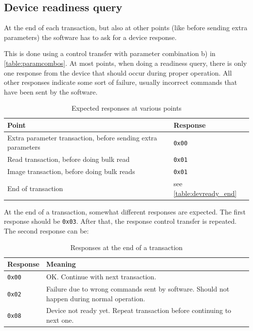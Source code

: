 \documentclass{article}
\begin{document}
\subsection{Device readiness query}
\label{ssec:devready}

At the end of each transaction, but also at other points (like before
sending extra parameters) the software has to ask for a device response.

This is done using a control transfer with parameter combination b) in \autoref{table:paramcombos}.
At most points, when doing a readiness query, there is only one response from the
device that should occur during proper operation. All other responses indicate some
sort of failure, usually incorrect commands that have been sent by the software.

\begin{table}[H]
  \caption{Expected responses at various points}
  \centering
  \begin{tabular}{p{9cm} | l}
    Point & Response \\ \hline
    Extra parameter transaction, before sending extra parameters & {\tt 0x00} \\
    Read transaction, before doing bulk read & {\tt 0x01} \\
    Image transaction, before doing bulk reads & {\tt 0x01} \\
    End of transaction & see \autoref{table:devready_end} \\
  \end{tabular}
\end{table}

At the end of a transaction, somewhat different responses are expected.
The first response should be {\tt 0x03}. After that, the response control transfer
is repeated. The second response can be:

\begin{table}[H]
  \caption{Responses at the end of a transaction}
  \centering
  \begin{tabular}{l | p{9cm}}
    Response & Meaning \\ \hline
    {\tt 0x00} & OK. Continue with next transaction. \\
    {\tt 0x02} & Failure due to wrong commands sent by software. Should not happen during normal operation. \\
    {\tt 0x08} & Device not ready yet. Repeat transaction before continuing to next one. \\
  \end{tabular}
  \label{table:devready_end}
\end{table}
\end{document}
